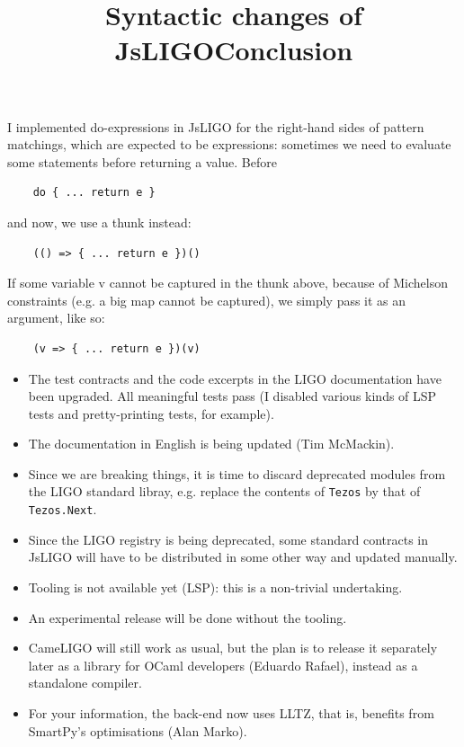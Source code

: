 \documentclass[wide]{slides}
\newcommand{\JsLIGO}[0]{\textsf{JsLIGO}}
\newcommand{\CameLIGO}[0]{\textsf{CameLIGO}}
\newcommand{\OCaml}[0]{\textsf{OCaml}}
\newcommand{\Michelson}[0]{\textsf{Michelson}}
\begin{document}
\begin{slide}
  \title{Syntactic changes of JsLIGO}

  I implemented do-expressions in \JsLIGO{} for the right\hyp{}hand
  sides of pattern matchings, which are expected to be expressions:
  sometimes we need to evaluate some statements before returning a
  value. Before
  \begin{lstlisting}
    do { ... return e }
  \end{lstlisting}
  and now, we use a thunk instead:
  \begin{lstlisting}
    (() => { ... return e })()
  \end{lstlisting}
  If some variable \textsf{v} cannot be captured in the thunk above,
  because of \Michelson{} constraints (e.g. a big map cannot be
  captured), we simply pass it as an argument, like so:
  \begin{lstlisting}
    (v => { ... return e })(v)
  \end{lstlisting}

\end{slide}

\begin{slide}
  \title{Conclusion}

  \begin{itemize}

    \item The test contracts and the code excerpts in the LIGO
      documentation have been upgraded. All meaningful tests pass (I
      disabled various kinds of LSP tests and pretty\hyp{}printing
      tests, for example).

    \item The documentation in English is being updated (Tim
      McMackin).

    \item Since we are breaking things, it is time to discard
      deprecated modules from the LIGO standard libray, e.g. replace
      the contents of \texttt{Tezos} by that of \texttt{Tezos.Next}.

    \item Since the LIGO registry is being deprecated, some standard
      contracts in \JsLIGO{} will have to be distributed in some other
      way and updated manually.

    \item Tooling is not available yet (LSP): this is a
      non\hyp{}trivial undertaking.

    \item An experimental release will be done without the tooling.

    \item \CameLIGO{} will still work as usual, but the plan is to
      release it separately later as a library for \OCaml{} developers
      (Eduardo Rafael), instead as a standalone compiler.

    \item For your information, the back\hyp{}end now uses LLTZ, that
      is, benefits from SmartPy's optimisations (Alan Marko).

  \end{itemize}

\end{slide}
\end{document}

